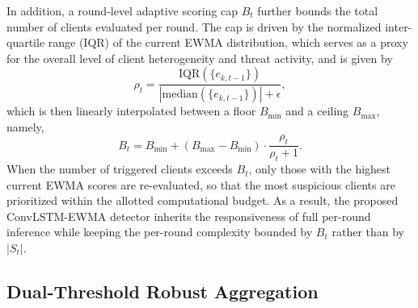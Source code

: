 \documentclass[journal]{IEEEtran}
\begin{document}
In addition, a round-level adaptive scoring cap $B_t$ further bounds the total number of clients evaluated per round. The cap is driven by the normalized inter-quartile range (IQR) of the current EWMA distribution, which serves as a proxy for the overall level of client heterogeneity and threat activity, and is given by
\begin{equation}
\rho_t = \frac{\mathrm{IQR}(\{e_{k,t-1}\})}{|\mathrm{median}(\{e_{k,t-1}\})| + \epsilon},
\label{eq:iqr_ratio}
\end{equation}
which is then linearly interpolated between a floor $B_{\min}$ and a ceiling $B_{\max}$, namely,
\begin{equation}
B_t = B_{\min} + (B_{\max} - B_{\min}) \cdot \frac{\rho_t}{\rho_t + 1}.
\label{eq:scoring_cap}
\end{equation}
When the number of triggered clients exceeds $B_t$, only those with the highest current EWMA scores are re-evaluated, so that the most suspicious clients are prioritized within the allotted computational budget. As a result, the proposed ConvLSTM-EWMA detector inherits the responsiveness of full per-round inference while keeping the per-round complexity bounded by $B_t$ rather than by $|S_t|$.

\subsection{Dual-Threshold Robust Aggregation}
\end{document}
